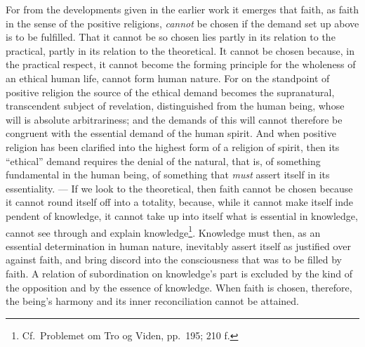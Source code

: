 \documentclass[12pt,a4paper]{book}
\begin{document}
For from the developments given in the earlier work it emerges that faith, as
faith in the sense of the positive religions, \emph{cannot} be chosen if the
demand set up above is to be fulfilled. That it cannot be so chosen lies
partly in its relation to the practical, partly in its relation to the
theoretical. It cannot be chosen because, in the practical respect, it cannot
become the forming principle for the wholeness of an ethical human life,
cannot form human nature. For on the standpoint of positive religion the
source of the ethical demand becomes the supranatural, transcendent subject of
revelation, distinguished from the human being, whose will is absolute
arbitrariness; and the demands of this will cannot therefore be congruent with
the essential demand of the human spirit. And when positive religion has been
clarified into the highest form of a religion of spirit, then its ``ethical''
demand requires the denial of the natural, that is, of something fundamental
in the human being, of something that \emph{must} assert itself in its
essentiality. --- If we look to the theoretical, then faith cannot be chosen
because it cannot round itself off into a totality, because, while it cannot
make itself inde\-%
\setcounter{footnote}{0}%
pendent of knowledge, it cannot take up into itself what is essential in
knowledge, cannot see through and explain knowledge\footnote{Cf.\ Problemet om
Tro og Viden, pp.\ 195; 210 f.}.
Knowledge must then, as an essential determination in human nature,
inevitably assert itself as justified over against faith, and bring discord
into the consciousness that was to be filled by faith. A relation of
subordination on knowledge's part is excluded by the kind of the opposition
and by the essence of knowledge. When faith is chosen, therefore, the being's
harmony and its inner reconciliation cannot be attained.
\end{document}

